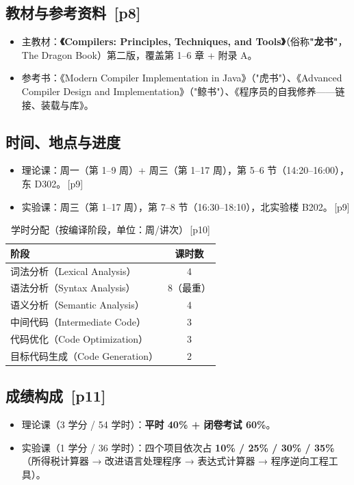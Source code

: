 \documentclass[UTF8,fontset=none,11pt]{ctexart}
\newcommand{\pg}[1]{{\small\color{gray}\,[p#1]}}
\begin{document}
\subsection{教材与参考资料 \pg{8}}
\begin{itemize}
  \item 主教材：\textbf{《Compilers: Principles, Techniques, and Tools》}（俗称\textbf{"龙书"}，The Dragon Book）第二版，覆盖第 1--6 章 + 附录 A。
  \item 参考书：《Modern Compiler Implementation in Java》（"虎书"）、《Advanced Compiler Design and Implementation》（"鲸书"）、《程序员的自我修养——链接、装载与库》。
\end{itemize}

\subsection{时间、地点与进度}
\begin{itemize}
  \item 理论课：周一（第 1--9 周）+ 周三（第 1--17 周），第 5--6 节（14:20--16:00），东 D302。\pg{9}
  \item 实验课：周三（第 1--17 周），第 7--8 节（16:30--18:10），北实验楼 B202。\pg{9}
\end{itemize}

\begin{table}[h]\centering
\small
\caption{学时分配（按编译阶段，单位：周/讲次）\pg{10}}
\begin{tabular}{lc}
\toprule
\textbf{阶段} & \textbf{课时数} \\
\midrule
词法分析（Lexical Analysis） & 4 \\
语法分析（Syntax Analysis） & 8（最重） \\
语义分析（Semantic Analysis） & 4 \\
中间代码（Intermediate Code） & 3 \\
代码优化（Code Optimization） & 3 \\
目标代码生成（Code Generation） & 2 \\
\bottomrule
\end{tabular}
\end{table}

\subsection{成绩构成 \pg{11}}
\begin{itemize}
  \item 理论课（3 学分 / 54 学时）：\textbf{平时 40\% + 闭卷考试 60\%}。
  \item 实验课（1 学分 / 36 学时）：四个项目依次占 \textbf{10\% / 25\% / 30\% / 35\%}
        （所得税计算器 → 改进语言处理程序 → 表达式计算器 → 程序逆向工程工具）。
\end{itemize}
\end{document}
